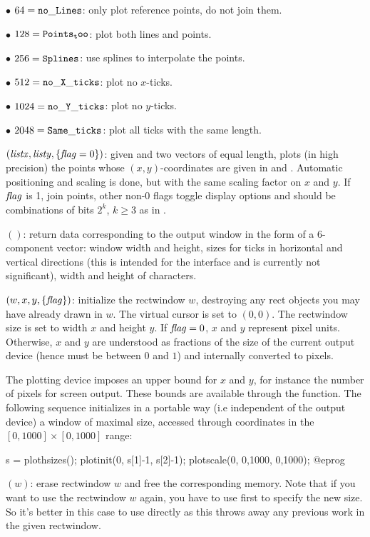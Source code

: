 $\bullet$ $64 = {\tt no\_Lines}$: only plot reference points, do not join them.

$\bullet$ $128 = {\tt Points_too}$: plot both lines and points.

$\bullet$ $256 = {\tt Splines}$: use splines to interpolate the points.

$\bullet$ $512 = {\tt no\_X\_ticks}$: plot no $x$-ticks.

$\bullet$ $1024 = {\tt no\_Y\_ticks}$: plot no $y$-ticks.

$\bullet$ $2048 = {\tt Same\_ticks}$: plot all ticks with the same length.

$(\hbox{\it listx\/},\hbox{\it listy\/},\{\hbox{\it f\kern0pt lag\/}=0\})$: given
 and  two vectors of equal length, plots (in high
precision) the points whose $(x,y)$-coordinates are given in 
and . Automatic positioning and scaling is done, but with the
same scaling factor on $x$ and $y$. If $\hbox{\it f\kern0pt lag\/}$ is 1, join points, other non-0
flags toggle display options and should be combinations of bits $2^k$, $k
\geq 3$ as in .

$()$: return data corresponding to the output window
in the form of a 6-component vector: window width and height, sizes for ticks
in horizontal and vertical directions (this is intended for the 
interface and is currently not significant), width and height of characters.

$(w,x,y,\{\hbox{\it f\kern0pt lag\/}\})$: initialize the rectwindow $w$,
destroying any rect objects you may have already drawn in $w$. The virtual
cursor is set to $(0,0)$. The rectwindow size is set to width $x$ and height
$y$. If $\hbox{\it f\kern0pt lag\/}=0$, $x$ and $y$ represent pixel units. Otherwise, $x$ and $y$
are understood as fractions of the size of the current output device (hence
must be between $0$ and $1$) and internally converted to pixels.

The plotting device imposes an upper bound for $x$ and $y$, for instance the
number of pixels for screen output. These bounds are available through the
 function. The following sequence initializes in a portable
way (i.e independent of the output device) a window of maximal size, accessed
through coordinates in the $[0,1000] \times [0,1000]$ range:

\bprog
s = plothsizes();
plotinit(0, s[1]-1, s[2]-1);
plotscale(0, 0,1000, 0,1000);
@eprog

$(w)$: erase rectwindow $w$ and free the corresponding
memory. Note that if you want to use the rectwindow $w$ again, you have to
use  first to specify the new size. So it's better in this case
to use  directly as this throws away any previous work in the
given rectwindow.

